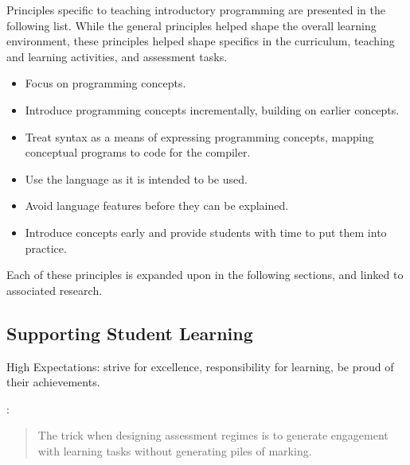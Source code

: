 



Principles specific to teaching introductory programming are presented in the following list. While the general principles helped shape the overall learning environment, these principles helped shape specifics in the curriculum, teaching and learning activities, and assessment tasks.

\begin{itemize}
	\item Focus on programming concepts.
	\item Introduce programming concepts incrementally, building on earlier concepts.
	\item Treat syntax as a means of expressing programming concepts, mapping conceptual programs to code for the compiler.
	\item Use the language as it is intended to be used.
	\item Avoid language features before they can be explained.
	\item Introduce concepts early and provide students with time to put them into practice.
\end{itemize}

Each of these principles is expanded upon in the following sections, and linked to associated research.






\subsection{Supporting Student Learning} %
\label{sub:supporting_student_learning}

High Expectations: strive for excellence, responsibility for learning, be proud of their achievements.

\citet{Chickering:1987}:

\citet{Gibbs:2004} 

\begin{quote}
	The trick when designing assessment regimes is to generate engagement with learning tasks without generating piles of marking.
\end{quote}

